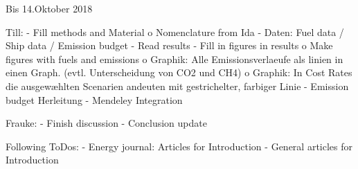 Bis 14.Oktober 2018

Till:
- Fill methods and Material
    o   Nomenclature from Ida
- Daten: Fuel data / Ship data / Emission budget
- Read results
- Fill in figures in results
    o   Make figures with fuels and emissions
    o   Graphik: Alle Emissionsverlaeufe als linien in einen Graph. (evtl. Unterscheidung von CO2 und CH4)
    o   Graphik: In Cost Rates die ausgewæhlten Scenarien andeuten mit gestrichelter, farbiger Linie
- Emission budget Herleitung
- Mendeley Integration

Frauke:
-	Finish discussion
-	Conclusion update

Following ToDos:
-	Energy journal: Articles for Introduction
-	General articles for Introduction
